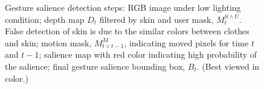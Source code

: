 \documentclass{acm_proc_article-sp}
\begin{document}
\begin{figure}[tb]
\centering
\hspace{-0.6em}%
\caption{Gesture salience detection steps:  RGB image under low lighting condition;
 depth map $D_t$ filtered by skin and user mask, $M_t^{S\wedge U}$. False detection of skin is due to
the similar colors between clothes and skin;  motion mask,  $M_{t\vee t-1}^M$, indicating moved pixels for time $t$ and $t-1$;
 salience map with red color indicating high probability of the salience; 
 final gesture salience bounding box, $B_t$. (Best viewed in
color.)}
\label{fig:gesture-salience}
\end{figure}
\end{document}
